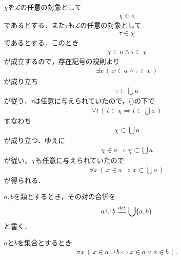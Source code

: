 	\begin{sketch}
		$\chi$を$\mathcal{L}$の任意の対象として
		\begin{align}
			\chi \in a
			\label{fom:thm_union_is_bigger_than_any_member_1}
		\end{align}
		であるとする．また$\tau$も$\mathcal{L}$の任意の対象として
		\begin{align}
			\tau \in \chi
		\end{align}
		であるとする．このとき
		\begin{align}
			\chi \in a \wedge \tau \in \chi
		\end{align}
		が成立するので，存在記号の規則より
		\begin{align}
			\exists x\, \left(\, x \in a \wedge \tau \in x\, \right)
		\end{align}
		が成り立ち
		\begin{align}
			\tau \in \bigcup a
		\end{align}
		が従う．$\tau$は任意に与えられていたので，()の下で
		\begin{align}
			\forall t\, (\, t \in \chi \Longrightarrow t \in \bigcup a\, )
		\end{align}
		すなわち
		\begin{align}
			\chi \subset \bigcup a
		\end{align}
		が成り立つ．ゆえに
		\begin{align}
			\chi \in a \Longrightarrow \chi \subset \bigcup a
		\end{align}
		が従い，$\chi$も任意に与えられていたので
		\begin{align}
			\forall x\, (\, x \in a \Longrightarrow x \subset \bigcup a\, )
		\end{align}
		が得られる．
		\QED
	\end{sketch}
	
	$a,b$を類とするとき，その対の合併を
	\begin{align}
		a \cup b \defeq \bigcup \{a,b\}
	\end{align}
	と書く．
	
	\begin{screen}
		\begin{thm}[対の合併はそれぞれの要素を合わせたもの]\label{thm:union_of_pair_is_union_of_their_elements}
			$a$と$b$を集合とするとき
			\begin{align}
				\forall x\, (\, x \in a \cup b \Longleftrightarrow x \in a \vee x \in b\, ).
			\end{align}
		\end{thm}
	\end{screen}
	
